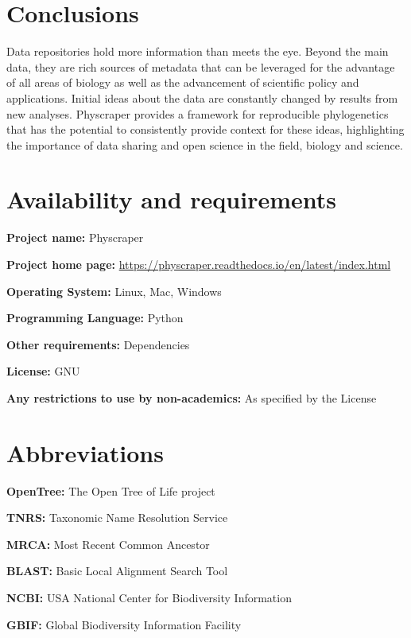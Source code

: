 \documentclass{bmcart}
\begin{document}
\section*{Conclusions}
Data repositories hold more information than meets the eye.
Beyond the main data, they are rich sources of metadata that can be leveraged
for the advantage of all areas of biology as well as the advancement of scientific
policy and applications.
Initial ideas about the data are constantly changed by results from new analyses.
Physcraper provides a framework for reproducible phylogenetics that has the
potential to consistently provide context for these ideas, highlighting the
importance of data sharing and open science in the field, biology and science.

\section*{Availability and requirements}

\textbf{Project name:} Physcraper

\textbf{Project home page:} \href{https://physcraper.readthedocs.io/en/latest/index.html}{https://physcraper.readthedocs.io/en/latest/index.html}

\textbf{Operating System:} Linux, Mac, Windows

\textbf{Programming Language:} Python

\textbf{Other requirements:} Dependencies

\textbf{License:} GNU

\textbf{Any restrictions to use by non-academics:} As specified by the License

\section*{Abbreviations}

\textbf{OpenTree:} The Open Tree of Life project

\textbf{TNRS:} Taxonomic Name Resolution Service

\textbf{MRCA:} Most Recent Common Ancestor

\textbf{BLAST:} Basic Local Alignment Search Tool

\textbf{NCBI:} USA National Center for Biodiversity Information

\textbf{GBIF:} Global Biodiversity Information Facility

\end{document}
